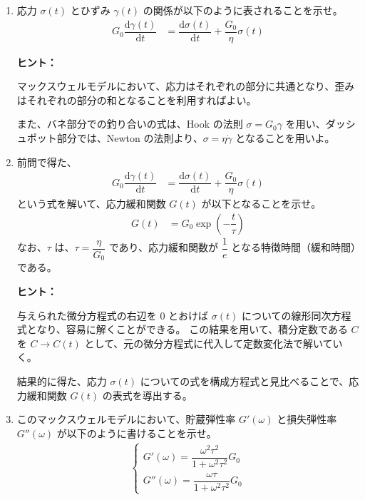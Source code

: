 \documentclass[uplatex,dvipdfmx,a4paper,11pt]{jsarticle}
\newcommand{\diff}{\mathrm d}
\newcommand{\difd}[2]{\dfrac{\diff #1}{\diff #2}}
\begin{document}
\begin{enumerate}
\setlength{\parskip}{0cm} %
\setlength{\itemsep}{0.5cm} %

\item
応力 $\sigma (t)$ とひずみ $\gamma(t)$ の関係が以下のように表されることを示せ。
\begin{align*}
G_0 \difd{\gamma (t)}{t}  
	&= \difd{\sigma (t)}{t} + \dfrac{G_0}{\eta} \sigma (t)
\end{align*}

\begin{itembox}[l]{{\bf ヒント：}}

マックスウェルモデルにおいて、応力はそれぞれの部分に共通となり、歪みはそれぞれの部分の和となることを利用すればよい。

また、バネ部分での釣り合いの式は、Hook の法則 $\sigma = G_0 \gamma$ を用い、ダッシュポット部分では、Newton の法則より、$\sigma = \eta \dot{\gamma}$ となることを用いよ。

\end{itembox}


\item
前問で得た、
\begin{align*}
G_0 \difd{\gamma (t)}{t}  
	&= \difd{\sigma (t)}{t} + \dfrac{G_0}{\eta} \sigma (t)
\end{align*}
という式を解いて、応力緩和関数 $G(t)$ が以下となることを示せ。
\begin{align*}
G(t) 
	&= G_0 \exp \left(-\dfrac{t}{\tau} \right)
\end{align*}
なお、$\tau$ は、$\tau = \dfrac{\eta}{G_0}$ であり、応力緩和関数が $\dfrac{1}{e}$ となる特徴時間（緩和時間）である。

\begin{itembox}[l]{{\bf ヒント：}}

与えられた微分方程式の右辺を 0 とおけば $\sigma(t)$ についての線形同次方程式となり、容易に解くことができる。
この結果を用いて、積分定数である $C$ を $C \rightarrow C (t)$ として、元の微分方程式に代入して定数変化法で解いていく。

結果的に得た、応力 $\sigma(t)$ についての式を構成方程式と見比べることで、応力緩和関数 $G(t)$ の表式を導出する。

\end{itembox}


\item
このマックスウェルモデルにおいて、貯蔵弾性率 $G'(\omega)$ と損失弾性率 $G''(\omega)$ が以下のように書けることを示せ。
\begin{align*}
\begin{cases}
G' (\omega) = \dfrac{\omega^2 \tau^2}{1+\omega^2 \tau^2} G_0 \\[8pt]
G'' (\omega) = \dfrac{\omega \tau}{1+\omega^2 \tau^2} G_0
\end{cases}
\end{align*}



\end{enumerate}
\end{document}
